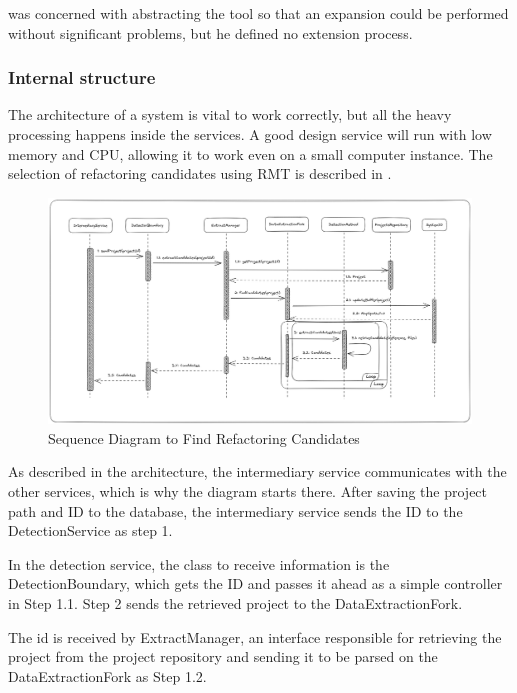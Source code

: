 \textcite{beluzzo2018abordagem} was concerned with abstracting the tool so that an expansion could be performed without significant problems, but he defined no extension process.

\subsubsection{Internal structure}
\label{subsub-internal}

The architecture of a system is vital to work correctly, but all the heavy processing happens inside the services. A good design service will run with low memory and CPU, allowing it to work even on a small computer instance. The selection of refactoring candidates using RMT is described in .

\begin{figure}[ht!]
\SetCaptionWidth{\textwidth}
\caption{Sequence Diagram to Find Refactoring Candidates}
\label{fig-candidates}
\includegraphics[width=160mm]{Chapter-2/Figures/candidates.png}
\end{figure}
\FloatBarrier

As described in the architecture, the intermediary service communicates with the other services, which is why the diagram starts there. After saving the project path and ID to the database, the intermediary service sends the ID to the DetectionService as step 1.

In the detection service, the class to receive information is the DetectionBoundary, which gets the ID and passes it ahead as a simple controller in Step 1.1. Step 2 sends the retrieved project to the DataExtractionFork.

The id is received by ExtractManager, an interface responsible for retrieving the project from the project repository and sending it to be parsed on the DataExtractionFork as Step 1.2.

